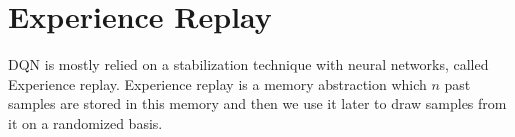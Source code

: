\documentclass[12pt]{report}
\begin{document}
\section{Experience Replay}
DQN is mostly relied on a stabilization technique with neural networks, called Experience replay. Experience replay is a memory abstraction which $n$ past samples are stored in this memory and then we use it later to draw samples from it on a randomized basis. 






\end{document}
